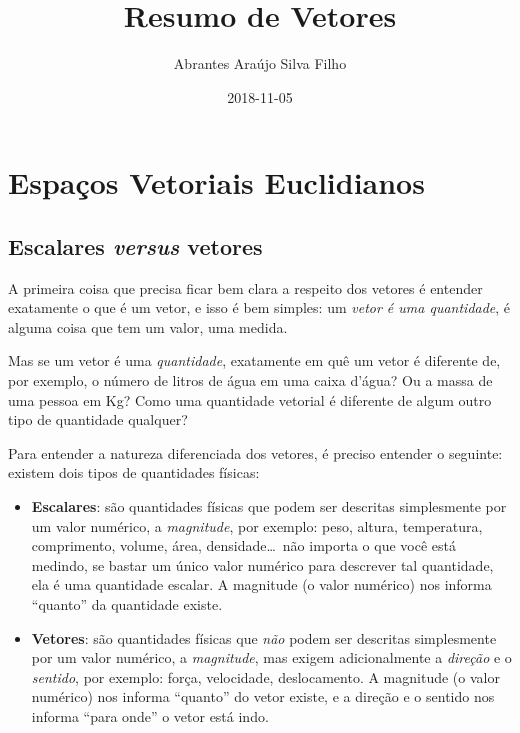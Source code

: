 \documentclass[pdftex, brazil, 12pt, twoside]{article}
\begin{document}
\title{Resumo de Vetores}
\author{Abrantes Araújo Silva Filho}
\date{2018-11-05}
\maketitle
\tableofcontents
\newpage




\section{Espaços Vetoriais Euclidianos}
\label{evd}


\subsection{Escalares \emph{versus} vetores}
\label{evd-esc-vet}

A primeira coisa que precisa ficar bem clara a respeito dos vetores é entender
exatamente o que é um vetor, e isso é bem simples: um \emph{vetor é uma quantidade},
é alguma coisa que tem um valor, uma medida.

Mas se um vetor é uma \emph{quantidade}, exatamente em quê um vetor é diferente
de, por exemplo, o número de litros de água em uma caixa d'água? Ou a
massa de uma pessoa em Kg? Como uma quantidade vetorial é diferente de algum
outro tipo de quantidade qualquer?

Para entender a natureza diferenciada dos vetores, é preciso entender o seguinte:
existem dois tipos de quantidades físicas:

\begin{itemize}
\item \textbf{Escalares}: são quantidades físicas que podem ser descritas
  simplesmente por um valor numérico, a \emph{magnitude}, por exemplo: peso,
  altura, temperatura,
  comprimento, volume, área, densidade\ldots\ não importa o que você está
  medindo, se bastar um único valor numérico para descrever
  tal quantidade, ela é uma quantidade escalar. A magnitude (o valor numérico) nos
  informa ``quanto'' da quantidade existe.
\item \textbf{Vetores}: são quantidades físicas que \emph{não} podem ser descritas
  simplesmente por um valor numérico, a \emph{magnitude}, mas exigem adicionalmente
  a \emph{direção} e o
  \emph{sentido}, por exemplo: força, velocidade, deslocamento. A magnitude (o valor
  numérico)
  nos informa ``quanto'' do vetor existe, e a direção e o sentido nos informa
  ``para onde'' o vetor está indo.
\end{itemize}
\end{document}
